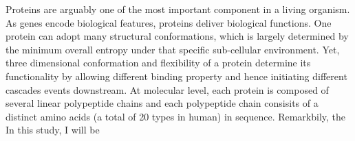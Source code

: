 Proteins are arguably one of the most important component in a living organism. As genes encode biological features, proteins deliver biological functions. One protein can adopt many structural conformations, which is largely determined by the minimum overall entropy under that specific sub-cellular environment. Yet, three dimensional conformation and flexibility of a protein determine its functionality by allowing different binding property and hence initiating different cascades events downstream. At molecular level, each protein is composed of several linear polypeptide chains and each polypeptide chain consisits of a distinct amino acids (a total of 20 types in human) in sequence. Remarkbily, the  In this study, I will be 